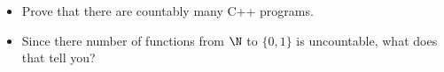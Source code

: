   \mbox{}
 \begin{itemize}
 \item Prove that there are countably many C++ programs.
 \item Since there number of functions from $\N$ to $\{0,1\}$ is
  uncountable, what does that tell you?
 \end{itemize}
